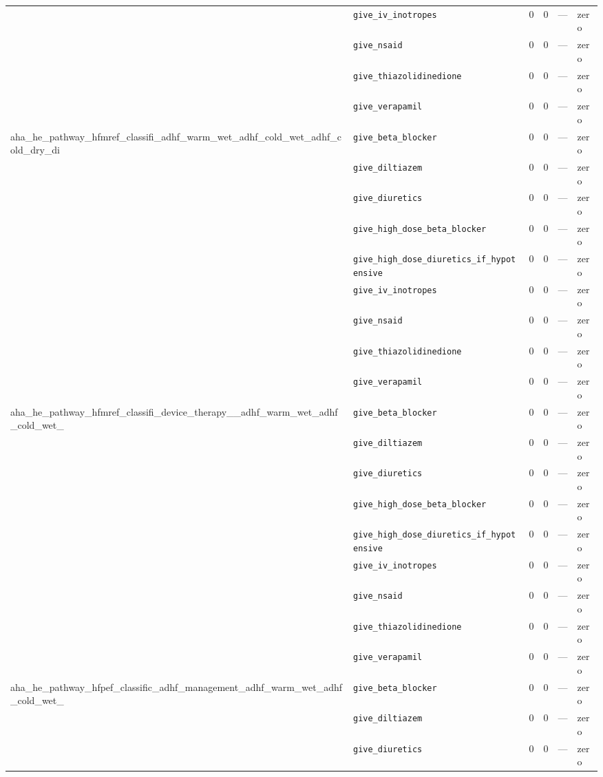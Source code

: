 \begin{table}[ht]
\begin{tabular}{llrrrl}
 & \texttt{give\_iv\_inotropes} & 0 & 0 & — & zero \\
 & \texttt{give\_nsaid} & 0 & 0 & — & zero \\
 & \texttt{give\_thiazolidinedione} & 0 & 0 & — & zero \\
 & \texttt{give\_verapamil} & 0 & 0 & — & zero \\
\midrule
aha\_he\_pathway\_hfmref\_classifi\_adhf\_warm\_wet\_adhf\_cold\_wet\_adhf\_cold\_dry\_di & \texttt{give\_beta\_blocker} & 0 & 0 & — & zero \\
 & \texttt{give\_diltiazem} & 0 & 0 & — & zero \\
 & \texttt{give\_diuretics} & 0 & 0 & — & zero \\
 & \texttt{give\_high\_dose\_beta\_blocker} & 0 & 0 & — & zero \\
 & \texttt{give\_high\_dose\_diuretics\_if\_hypotensive} & 0 & 0 & — & zero \\
 & \texttt{give\_iv\_inotropes} & 0 & 0 & — & zero \\
 & \texttt{give\_nsaid} & 0 & 0 & — & zero \\
 & \texttt{give\_thiazolidinedione} & 0 & 0 & — & zero \\
 & \texttt{give\_verapamil} & 0 & 0 & — & zero \\
\midrule
aha\_he\_pathway\_hfmref\_classifi\_device\_therapy\_\_adhf\_warm\_wet\_adhf\_cold\_wet\_ & \texttt{give\_beta\_blocker} & 0 & 0 & — & zero \\
 & \texttt{give\_diltiazem} & 0 & 0 & — & zero \\
 & \texttt{give\_diuretics} & 0 & 0 & — & zero \\
 & \texttt{give\_high\_dose\_beta\_blocker} & 0 & 0 & — & zero \\
 & \texttt{give\_high\_dose\_diuretics\_if\_hypotensive} & 0 & 0 & — & zero \\
 & \texttt{give\_iv\_inotropes} & 0 & 0 & — & zero \\
 & \texttt{give\_nsaid} & 0 & 0 & — & zero \\
 & \texttt{give\_thiazolidinedione} & 0 & 0 & — & zero \\
 & \texttt{give\_verapamil} & 0 & 0 & — & zero \\
\midrule
aha\_he\_pathway\_hfpef\_classific\_adhf\_management\_adhf\_warm\_wet\_adhf\_cold\_wet\_ & \texttt{give\_beta\_blocker} & 0 & 0 & — & zero \\
 & \texttt{give\_diltiazem} & 0 & 0 & — & zero \\
 & \texttt{give\_diuretics} & 0 & 0 & — & zero \\

\end{tabular}
\end{table}

